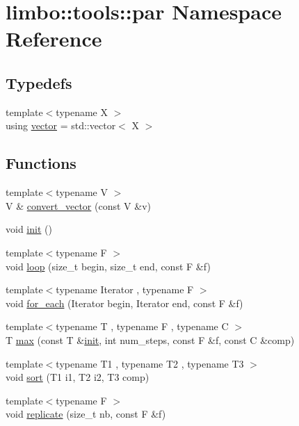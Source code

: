 \hypertarget{namespacelimbo_1_1tools_1_1par}{}\section{limbo\+:\+:tools\+:\+:par Namespace Reference}
\label{namespacelimbo_1_1tools_1_1par}
\subsection*{Typedefs}
\begin{DoxyCompactItemize}
\item 
{\footnotesize template$<$typename X $>$ }\\using \hyperlink{namespacelimbo_1_1tools_1_1par_af51cb7a6b55652377e2553e6de65b948}{vector} = std\+::vector$<$ X $>$
\end{DoxyCompactItemize}
\subsection*{Functions}
\begin{DoxyCompactItemize}
\item 
{\footnotesize template$<$typename V $>$ }\\V \& \hyperlink{namespacelimbo_1_1tools_1_1par_ae700f38cb80d3db4307227c2f33e72e7}{convert\+\_\+vector} (const V \&v)
\item 
void \hyperlink{group__par__tools_ga1d650a019b6c1bb551cb42f1c3f5ef82}{init} ()
\item 
{\footnotesize template$<$typename F $>$ }\\void \hyperlink{group__par__tools_ga0e0d97b2a06005eac32290a846ccef91}{loop} (size\+\_\+t begin, size\+\_\+t end, const F \&f)
\item 
{\footnotesize template$<$typename Iterator , typename F $>$ }\\void \hyperlink{group__par__tools_gaa7bbb8a640ed2b66101d57b5b565457f}{for\+\_\+each} (Iterator begin, Iterator end, const F \&f)
\item 
{\footnotesize template$<$typename T , typename F , typename C $>$ }\\T \hyperlink{group__par__tools_gaf3fdc36fc4e94ad4cac72c803234b6ac}{max} (const T \&\hyperlink{group__par__tools_ga1d650a019b6c1bb551cb42f1c3f5ef82}{init}, int num\+\_\+steps, const F \&f, const C \&comp)
\item 
{\footnotesize template$<$typename T1 , typename T2 , typename T3 $>$ }\\void \hyperlink{group__par__tools_gab29bca0dac2a8917b8447bc52d376f1c}{sort} (T1 i1, T2 i2, T3 comp)
\item 
{\footnotesize template$<$typename F $>$ }\\void \hyperlink{group__par__tools_gade6005a5ea74ca5203203d30210c0f22}{replicate} (size\+\_\+t nb, const F \&f)
\end{DoxyCompactItemize}


